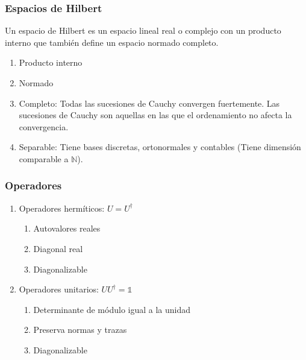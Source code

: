 \documentclass[xetex,mathserif,serif, 8pt]{beamer}
\begin{document}
\begin{frame}
    \frametitle{Espacios de Hilbert}

    Un espacio de Hilbert es un espacio lineal real o complejo con un producto interno que también define un espacio normado completo.

    \begin{enumerate}
        \item Producto interno
        \item Normado
        \item Completo: Todas las sucesiones de Cauchy convergen fuertemente. Las sucesiones de Cauchy son aquellas en las que el ordenamiento no afecta la convergencia.
        \item Separable: Tiene bases discretas, ortonormales y contables (Tiene dimensión comparable a $\mathds{N}$).
    \end{enumerate}

\end{frame}

\begin{frame}
    \frametitle{Operadores}

    \begin{enumerate}
        \item Operadores hermíticos: $U = U^\dagger$
            \begin{enumerate}
                \item Autovalores reales
                \item Diagonal real
                \item Diagonalizable
            \end{enumerate}
            \vspace{0.5cm}

        \item Operadores unitarios: $U U^\dagger = \mathds{1}$
            \begin{enumerate}
                \item Determinante de módulo igual a la unidad
                \item Preserva normas y trazas
                \item Diagonalizable
            \end{enumerate}
    \end{enumerate}

\end{frame}
\end{document}
